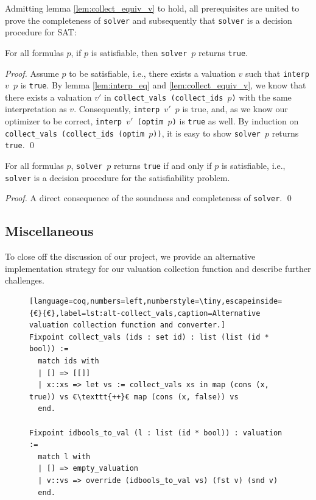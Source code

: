 Admitting lemma \ref{lem:collect_equiv_v} to hold, all prerequisites are united to prove the completeness of \texttt{solver} and subsequently that \texttt{solver} is a decision procedure for SAT:
\begin{lemma}
    For all formulas $p$, if $p$ is satisfiable, then \texttt{solver $p$} returns \texttt{true}.
\end{lemma}
\begin{proof}
    Assume $p$ to be satisfiable, i.e., there exists a valuation $v$ such that \texttt{interp $v$ $p$} is \texttt{true}.
    By lemma \ref{lem:interp_eq} and \ref{lem:collect_equiv_v}, we know that there exists a valuation $v'$ in \texttt{collect\_vals (collect\_ids $p$)} with the same interpretation as $v$.
    Consequently, \texttt{interp $v'$ $p$} is true, and, as we know our optimizer to be correct, \texttt{interp $v'$ (optim $p$)} is \texttt{true} as well.
    By induction on \texttt{collect\_vals (collect\_ids (optim $p$))}, it is easy to show \texttt{solver $p$} returns \texttt{true}. \qed
\end{proof}

\begin{theorem}
    For all formulas $p$, \texttt{solver $p$} returns \texttt{true} if and only if $p$ is satisfiable, i.e., \texttt{solver} is a decision procedure for the satisfiability problem.
\end{theorem}
\begin{proof}
    A direct consequence of the soundness and completeness of \texttt{solver}. \qed
\end{proof}

\subsection{Miscellaneous}

To close off the discussion of our project, we provide an alternative implementation strategy for our valuation collection function and describe further challenges.

\begin{figure}[t]
    \begin{lstlisting}[language=coq,numbers=left,numberstyle=\tiny,escapeinside={€}{€},label=lst:alt-collect_vals,caption=Alternative valuation collection function and converter.]
Fixpoint collect_vals (ids : set id) : list (list (id * bool)) :=
  match ids with
  | [] => [[]]
  | x::xs => let vs := collect_vals xs in map (cons (x, true)) vs €\texttt{++}€ map (cons (x, false)) vs
  end.

Fixpoint idbools_to_val (l : list (id * bool)) : valuation :=
  match l with
  | [] => empty_valuation
  | v::vs => override (idbools_to_val vs) (fst v) (snd v)
  end.
    \end{lstlisting}
\end{figure}

